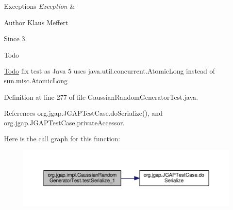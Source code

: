 \begin{DoxyExceptions}{Exceptions}
{\em Exception} & \\
\hline
\end{DoxyExceptions}
\begin{DoxyAuthor}{Author}
Klaus Meffert 
\end{DoxyAuthor}
\begin{DoxySince}{Since}
3. 
\end{DoxySince}
\begin{DoxyRefDesc}{Todo}
\item[\hyperlink{todo__todo000201}{Todo}]fix test as Java 5 uses java.\-util.\-concurrent.\-Atomic\-Long instead of sun.\-misc.\-Atomic\-Long \end{DoxyRefDesc}


Definition at line 277 of file Gaussian\-Random\-Generator\-Test.\-java.



References org.\-jgap.\-J\-G\-A\-P\-Test\-Case.\-do\-Serialize(), and org.\-jgap.\-J\-G\-A\-P\-Test\-Case.\-private\-Accessor.



Here is the call graph for this function\-:
\nopagebreak
\begin{figure}[H]
\begin{center}
\leavevmode
\includegraphics[width=350pt]{classorg_1_1jgap_1_1impl_1_1_gaussian_random_generator_test_a9710b02b268a1019979c45a065789341_cgraph}
\end{center}
\end{figure}




